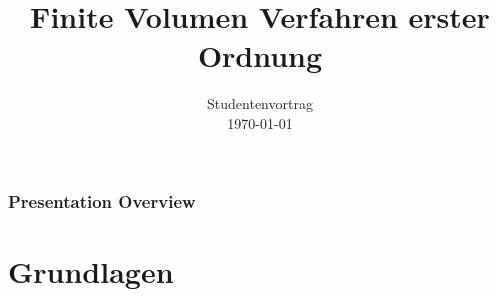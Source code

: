 \documentclass[
	11pt, %
	aspectratio=169, %
]{beamer}
\title[FV 1. O.]{Finite Volumen Verfahren erster Ordnung} %
\author[Jannik Schrempp\and Hendrik Klemm]{}%
\institute[]{University of Stuttgart} %
\date[\today]{Studentenvortrag \\ \today} %
\begin{document}

\begin{frame}
	\titlepage %
\end{frame}



\begin{frame}
	\frametitle{Presentation Overview} %
	
	\tableofcontents %
\end{frame}


\section{Grundlagen} %
\end{document}
